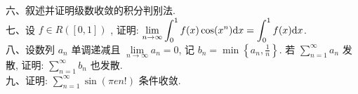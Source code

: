 \documentclass[UTF8]{ctexart}
\begin{document}
六、叙述并证明级数收敛的积分判别法.
\\

七、设 $f\in R([0,1])$ , 证明: $\displaystyle\lim\limits_{n\rightarrow\infty}\int_{0}^{1}f(x)\cos (x^n){\rm d}x=\int_{0}^{1}f(x){\rm d}x$.
\\

八、设数列 ${a_n}$ 单调递减且 $\lim\limits_{n\rightarrow\infty}a_n=0$, 记 $b_n=\displaystyle \min \left\{ a_n,\frac{1}{n} \right\} $. 若 $\displaystyle\sum\limits_{n=1}^{\infty}a_n$ 发散, 证明: $\displaystyle\sum\limits_{n=1}^{\infty}b_n$ 也发散.
\\

九、证明: $\displaystyle\sum\limits_{n=1}^{\infty}\sin(\pi e n!)$ 条件收敛.
\end{document}
